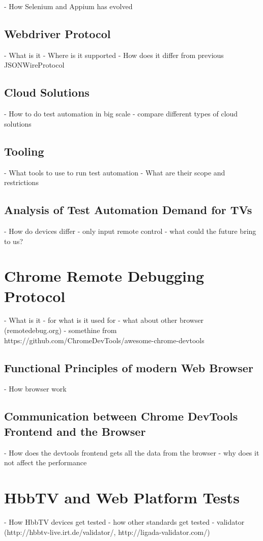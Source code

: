 - How Selenium and Appium has evolved

\subsection{Webdriver Protocol\label{sec:webdriver}}

- What is it
- Where is it supported
- How does it differ from previous JSONWireProtocol

\subsection{Cloud Solutions\label{sec:cloud}}

- How to do test automation in big scale
- compare different types of cloud solutions

\subsection{Tooling\label{sec:tooling}}

- What tools to use to run test automation
- What are their scope and restrictions

\subsection{Analysis of Test Automation Demand for TVs\label{sec:testautomationontv}}

- How do devices differ
- only input remote control
- what could the future bring to us?

\section{Chrome Remote Debugging Protocol}

- What is it
- for what is it used for
- what about other browser (remotedebug.org)
- somethine from https://github.com/ChromeDevTools/awesome-chrome-devtools

\subsection{Functional Principles of modern Web Browser\label{sec:howbrowserwork}}

- How browser work

\subsection{Communication between Chrome DevTools Frontend and the Browser}

- How does the devtools frontend gets all the data from the browser
- why does it not affect the performance

\section{HbbTV and Web Platform Tests}

- How HbbTV devices get tested
- how other standards get tested
- validator (http://hbbtv-live.irt.de/validator/, http://ligada-validator.com/)
